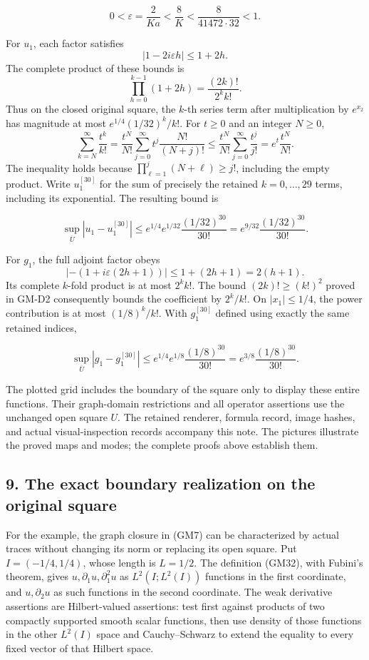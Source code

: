 \documentclass[
  11pt,
]{article}
\begin{document}
\[
 0<\varepsilon=\frac2{Ka}<\frac8K
       <\frac8{41472\cdot32}<1.
 \tag{GM50}
\]

For \(u_1\), each factor satisfies
\[
 |1-2i\varepsilon h|\leq1+2h.
\] The complete product of these bounds is
\[
 \prod_{h=0}^{k-1}(1+2h)=\frac{(2k)!}{2^k k!}.
\] Thus on the closed original square, the
\(k\)-th series term after multiplication by
\(e^{x_2}\) has magnitude at most
\(e^{1/4}(1/32)^k/k!\). For \(t\geq0\) and an
integer \(N\geq0\), \[
 \sum_{k=N}^{\infty}\frac{t^k}{k!}
   =\frac{t^N}{N!}
       \sum_{j=0}^{\infty}t^j\frac{N!}{(N+j)!}
   \leq\frac{t^N}{N!}\sum_{j=0}^{\infty}\frac{t^j}{j!}
   =e^t\frac{t^N}{N!}.
\] The
inequality holds because \(\prod_{\ell=1}^j(N+\ell)\geq j!\), including the empty
product. Write \(u_1^{[30]}\) for the sum of precisely the
retained \(k=0,\ldots,29\) terms, including its exponential.
The resulting bound is

\[
 \sup_{\overline U}|u_1-u_1^{[30]}|
       \leq e^{1/4}e^{1/32}\frac{(1/32)^{30}}{30!}
       =e^{9/32}\frac{(1/32)^{30}}{30!}.
 \tag{GM51}
\]

For \(g_1\), the full adjoint factor obeys
\[
 |-(1+i\varepsilon(2h+1))|
       \leq1+(2h+1)=2(h+1).
\] Its complete \(k\)-fold
product is at most \(2^k k!\). The bound
\((2k)!\geq(k!)^2\) proved in GM-D2 consequently bounds the
coefficient by \(2^k/k!\). On
\(|x_1|\leq1/4\), the power contribution is at most
\((1/8)^k/k!\). With \(g_1^{[30]}\) defined
using exactly the same retained indices,

\[
 \sup_{\overline U}|g_1-g_1^{[30]}|
       \leq e^{1/4}e^{1/8}\frac{(1/8)^{30}}{30!}
       =e^{3/8}\frac{(1/8)^{30}}{30!}.
 \tag{GM52}
\]

The plotted grid includes the boundary of the square only to display
these entire functions. Their graph-domain restrictions and all operator
assertions use the unchanged open square \(U\). The
retained renderer, formula record, image hashes, and actual
visual-inspection records accompany this note. The pictures illustrate
the proved maps and modes; the complete proofs above establish them.

\subsection{9. The exact boundary realization on the original
square}\label{the-exact-boundary-realization-on-the-original-square}

For the example, the graph closure in (GM7) can be characterized by
actual traces without changing its norm or replacing its open square.
Put \(I=(-1/4,1/4)\), whose length is
\(L=1/2\). The definition (GM32), with Fubini's
theorem, gives \(u,\partial_1u,\partial_1^2u\) as \(L^2(I;L^2(I))\)
functions in the first coordinate, and \(u,\partial_2u\) as
such functions in the second coordinate. The weak derivative assertions
are Hilbert-valued assertions: test first against products of two
compactly supported smooth scalar functions, then use density of those
functions in the other \(L^2(I)\) space and
Cauchy--Schwarz to extend the equality to every fixed vector of that
Hilbert space.
\end{document}
